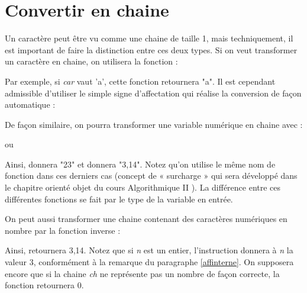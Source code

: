 \section{Convertir en chaine}

	Un caractère peut être vu comme une chaine de taille 1, 
	mais techniquement, 
	il est important de faire la distinction entre ces deux types. 
	Si on veut transformer un caractère en chaine, 
	on utilisera la fonction :

	\begin{center}
	\end{center}

	Par exemple, si \textit{car} vaut 'a', cette fonction retournera "a". 
	Il est cependant admissible d'utiliser le simple signe d'affectation 
	qui réalise la conversion de façon automatique :

	\begin{center}
	\end{center}

	De façon similaire, 
	on pourra transformer une variable numérique en chaine avec :

	\begin{center}
	\end{center}

	ou

	\begin{center}
	\end{center}

	Ainsi,  donnera "23" 
	et  donnera "3,14". 
	Notez qu'on utilise le même nom de fonction dans ces derniers cas 
	(concept de « surcharge » qui sera développé 
	dans le chapitre orienté objet du cours \og Algorithmique II \fg). 
	La différence entre ces différentes fonctions 
	se fait par le type de la variable en entrée.

	On peut aussi transformer une chaine 
	contenant des caractères numériques 
	en nombre par la fonction inverse :

	\begin{center}
	\end{center}

	Ainsi, 
	 retournera 3,14. 
	Notez que si \textit{n} est un entier, 
	l'instruction  donnera à \textit{n} la valeur 3, 
	conformément à la remarque du paragraphe \vref{affinterne}. 
	On supposera encore que si la chaine \textit{ch} ne représente pas 
	un nombre de façon correcte, la fonction retournera 0.

